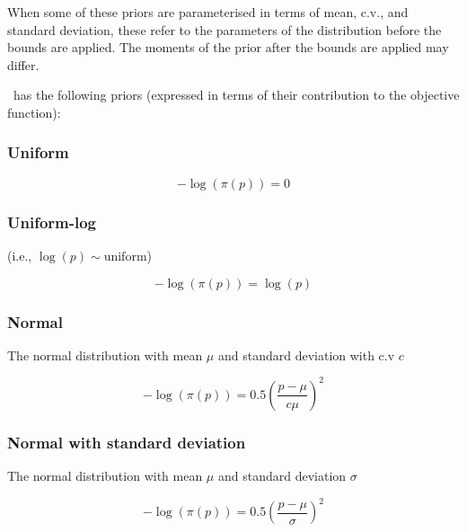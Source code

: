 When some of these priors are parameterised in terms of mean, c.v., and standard deviation, these refer to the parameters of the distribution before the bounds are applied. The moments of the prior after the bounds are applied may differ.

\CNAME\ has the following priors (expressed in terms of their contribution to the objective function):


\subsubsection{Uniform}\label{sec:Prior-Uniform}

\begin{equation}
 - \log \left(\pi \left(p \right) \right) = 0
\end{equation}

\subsubsection{Uniform-log} (i.e., $\log(p) \sim \text{uniform}$)\label{sec:Prior-UniformLog}

\begin{equation}
 - \log \left(\pi \left(p \right) \right) = \log \left( p \right)
\end{equation}

\subsubsection{Normal}\label{sec:Prior-Normal}

The normal distribution with mean $\mu$ and standard deviation with c.v $c$

\begin{equation}
 - \log \left(\pi \left(p \right) \right) = 0.5\left(\frac{p - \mu}{c\mu} \right)^2
\end{equation}

\subsubsection{Normal with standard deviation}\label{sec:Prior-NormalByStdev}

The normal distribution with mean $\mu$ and standard deviation $\sigma$

\begin{equation}
 - \log \left(\pi \left(p \right) \right) = 0.5\left(\frac{p - \mu}
{\sigma }\right)^2
\end{equation}

